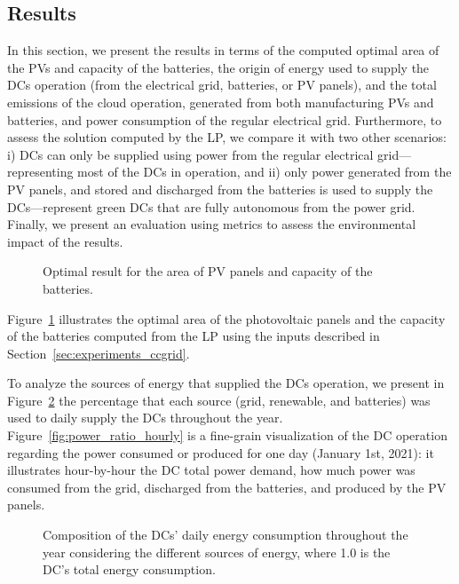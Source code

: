 \subsection{Results}
\label{sec:results_ccgrid}
In this section, we present the results in terms of the computed optimal area of the PVs and capacity of the batteries, the origin of energy used to supply the DCs operation (from the electrical grid, batteries, or PV panels), and the total emissions of the cloud operation, generated from both manufacturing PVs and batteries, and power consumption of the regular electrical grid. Furthermore, to assess the solution computed by the LP, we compare it with two other scenarios: i) DCs can only be supplied using power from the regular electrical grid---representing most of the DCs in operation, and ii) only power generated from the PV panels, and stored and discharged from the batteries is used to supply the DCs---represent green DCs that are fully autonomous from the power grid. Finally, we present an evaluation using metrics to assess the environmental impact of the results.

\begin{figure}[h]
  \centering
  {}
  \caption{Optimal result for the area of PV panels and capacity of the batteries.}
  \label{fig:sizing}
\end{figure}

Figure~\ref{fig:sizing} illustrates the optimal area of the photovoltaic panels and the capacity of the batteries computed from the LP using the inputs described in Section~\ref{sec:experiments_ccgrid}.

To analyze the sources of energy that supplied the DCs operation, we present in Figure~\ref{fig:energy_ratio_daily} the percentage that each source (grid, renewable, and batteries) was used to daily supply the DCs throughout the year. Figure~\ref{fig:power_ratio_hourly} is a fine-grain visualization of the DC operation regarding the power consumed or produced for one day (January 1st, 2021): it illustrates hour-by-hour the DC total power demand, how much power was consumed from the grid, discharged from the batteries, and produced by the PV panels.
 

\begin{figure}[h]
  \centering
   {}
  \caption{Composition of the DCs' daily energy consumption throughout the year considering the different sources of energy, where 1.0 is the DC's total energy consumption.}
  \label{fig:energy_ratio_daily}
\end{figure}





